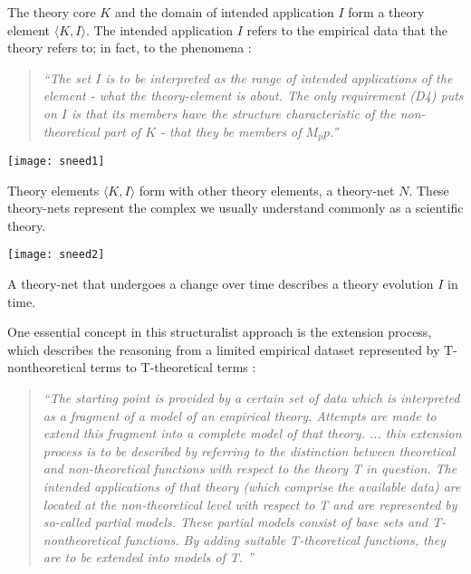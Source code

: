 \documentclass{article}
\begin{document}
The theory core $K$ and the domain of intended application $I$ form a theory element $ \langle K,I \rangle $. The intended application $I$ refers to the empirical data that the theory refers to; in fact, to the phenomena \cite[p.125]{sneed1976philosophical}:

\begin{quote}
\textit{``The set $I$ is to be interpreted as the range of intended applications of the element - what the theory-element is about. The only requirement (D4) puts on $I$ is that its members have the structure characteristic of the non-theoretical part of $K$ - that they be members of $M_pp$.''}
\end{quote}

\begin{minipage}{\textwidth}
\centering
\texttt{[image: sneed1]}

\end{minipage}
\bigskip


Theory elements $ \langle K,I \rangle $ form with other theory elements, a theory-net $N$. These theory-nets represent the complex we usually understand commonly as a scientific theory. 


\begin{minipage}{\textwidth}
\centering
\texttt{[image: sneed2]}

\end{minipage}
\bigskip

A theory-net that undergoes a change over time describes a theory evolution $I$ in time. 

One essential concept in this structuralist approach is the extension process, which describes the reasoning from a limited empirical dataset represented by T-nontheoretical terms to T-theoretical terms \cite[p.1459-1460]{gahde2014theory}:

\begin{quote}
\textit{``The starting point is provided by a certain set of data which is interpreted as a fragment of a model of an empirical theory. Attempts are made to extend this fragment into a complete model of that theory.
...
this extension process is to be described by referring to the distinction between theoretical and non-theoretical functions with respect to the theory T in question. The intended applications of that theory (which comprise the available data) are located at the non-theoretical level with respect to T and are represented by
so-called partial models. These partial models consist of base sets and T-nontheoretical functions. By adding suitable T-theoretical functions, they are to be
extended into models of T. ''}
\end{quote}
\end{document}
